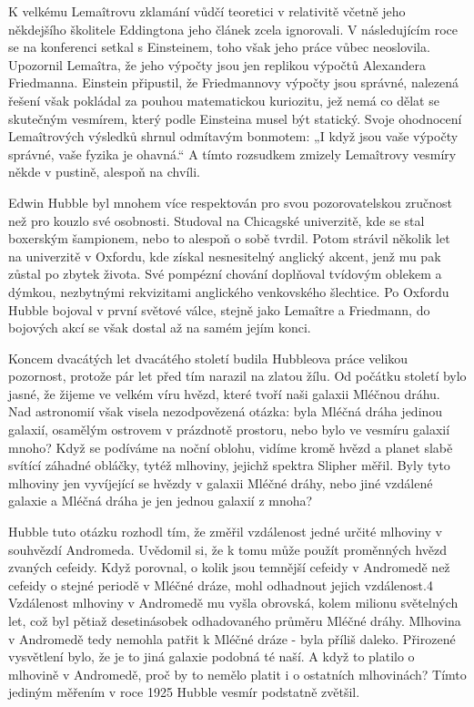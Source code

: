   K velkému Lemaîtrovu zklamání vůdčí teoretici v relativitě včetně jeho někdejšího školitele
  Eddingtona jeho článek zcela ignorovali. V následujícím roce se na konferenci setkal s Einsteinem,
  toho však jeho práce vůbec neoslovila. Upozornil Lemaîtra, že jeho výpočty jsou jen replikou
  výpočtů Alexandera Friedmanna. Einstein připustil, že Friedmannovy výpočty jsou správné, nalezená
  řešení však pokládal za pouhou matematickou kuriozitu, jež nemá co dělat se skutečným vesmírem,
  který podle Einsteina musel být statický. Svoje ohodnocení Lemaîtrových výsledků shrnul odmítavým
  bonmotem: „I když jsou vaše výpočty správné, vaše fyzika je ohavná.“ A tímto rozsudkem zmizely
  Lemaîtrovy vesmíry někde v pustině, alespoň na chvíli. 
  
  Edwin Hubble byl mnohem více respektován pro svou pozorovatelskou zručnost než pro kouzlo své
  osobnosti. Studoval na Chicagské univerzitě, kde se stal boxerským šampionem, nebo to alespoň o
  sobě tvrdil. Potom strávil několik let na univerzitě v Oxfordu, kde získal nesnesitelný anglický
  akcent, jenž mu pak zůstal po zbytek života. Své pompézní chování doplňoval tvídovým oblekem a
  dýmkou, nezbytnými rekvizitami anglického venkovského šlechtice. Po Oxfordu Hubble bojoval v první
  světové válce, stejně jako Lemaître a Friedmann, do bojových akcí se však dostal až na samém jejím
  konci. 
  
  Koncem dvacátých let dvacátého století budila Hubbleova práce velikou pozornost, protože pár let
  před tím narazil na zlatou žílu. Od počátku století bylo jasné, že žijeme ve velkém víru hvězd,
  které tvoří naši galaxii Mléčnou dráhu. Nad astronomií však visela nezodpovězená otázka: byla
  Mléčná dráha jedinou galaxií, osamělým ostrovem v prázdnotě prostoru, nebo bylo ve vesmíru galaxií
  mnoho? Když se podíváme na noční oblohu, vidíme kromě hvězd a planet slabě svítící záhadné
  obláčky, tytéž mlhoviny, jejichž spektra Slipher měřil. Byly tyto mlhoviny jen vyvíjející se
  hvězdy v galaxii Mléčné dráhy, nebo jiné vzdálené galaxie a Mléčná dráha je jen jednou galaxií z
  mnoha? 
  
  Hubble tuto otázku rozhodl tím, že změřil vzdálenost jedné určité mlhoviny v souhvězdí
  Andromeda. Uvědomil si, že k tomu může použít proměnných hvězd zvaných cefeidy. Když porovnal, o
  kolik jsou temnější cefeidy v Andromedě než cefeidy o stejné periodě v Mléčné dráze, mohl
  odhadnout jejich vzdálenost.4 Vzdálenost mlhoviny v Andromedě mu vyšla obrovská, kolem milionu
  světelných let, což byl pětiaž desetinásobek odhadovaného průměru Mléčné dráhy. Mlhovina v
  Andromedě tedy nemohla patřit k Mléčné dráze - byla příliš daleko. Přirozené vysvětlení bylo, že
  je to jiná galaxie podobná té naší. A když to platilo o mlhovině v Andromedě, proč by to nemělo
  platit i o ostatních mlhovinách? Tímto jediným měřením v roce 1925 Hubble vesmír podstatně
  zvětšil. 
  
